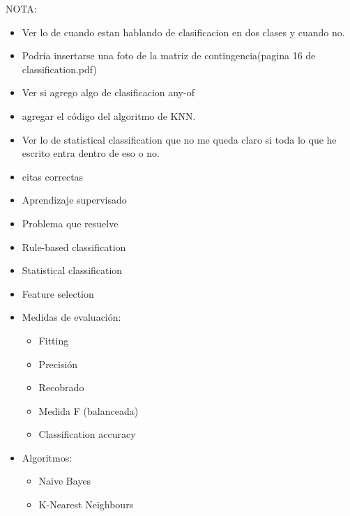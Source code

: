 \documentclass{llncs}
\begin{document}
		
		\color{red}
		 NOTA:
		\begin{itemize}
			\item Ver lo de cuando estan hablando de clasificacion en dos clases y cuando no. 
			\item Podr\'ia insertarse una foto de la matriz de contingencia(pagina 16 de classification.pdf)
			\item Ver si agrego algo de clasificacion any-of
			\item agregar el c\'odigo del algoritmo de KNN.
			\item Ver lo de statistical classification que no me queda claro si toda lo que he escrito entra dentro de eso o no.
			\item citas correctas
		\end{itemize}
		\color{black}
		
		
		
		 
		 
		 
	
\begin{itemize}
	\item Aprendizaje supervisado
	
	\item Problema que resuelve
\end{itemize}

\begin{itemize}
\item Rule-based classification

\item Statistical classification

\item Feature selection

\item Medidas de evaluaci\'on:
\begin{itemize}
	\item Fitting
	\item Precisi\'on
	\item Recobrado
	\item Medida F (balanceada)
	\item Classification accuracy
\end{itemize}

\item Algoritmos:
\begin{itemize}
	\item Naive Bayes
	
	
	\item K-Nearest Neighbours
\end{itemize}
\end{itemize}
\end{document}
